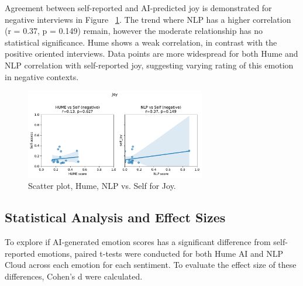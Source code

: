 Agreement between self-reported and AI-predicted joy is demonstrated for negative interviews in Figure ~\ref{fig:scatter-joy-rq3-neg}.
The trend where NLP has a higher correlation (r = 0.37, p = 0.149) remain, however the moderate relationship has no statistical significance. Hume shows a weak correlation, in contrast with the positive oriented interviews. Data points are more widespread for both Hume and NLP correlation with self-reported joy, suggesting varying rating of this emotion in negative contexts. 
\begin{figure}[H]
    \centering
    \includegraphics[width=0.7\textwidth]{png/results/rq3/scatter_joy_vs_self_negative.pdf}
    \caption{Scatter plot, Hume, NLP vs. Self for Joy.}
    \label{fig:scatter-joy-rq3-neg}
\end{figure}

\subsection{Statistical Analysis and Effect Sizes}

To explore if AI-generated emotion scores has a significant difference from self-reported emotions, paired t-tests were conducted for both Hume AI and NLP Cloud across each emotion for each sentiment. 
To evaluate the effect size of these differences, Cohen's d were calculated. 

